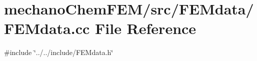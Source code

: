 \section{mechano\+Chem\+F\+E\+M/src/\+F\+E\+Mdata/\+F\+E\+Mdata.cc File Reference}
\label{_f_e_mdata_8cc}
{\ttfamily \#include \char`\"{}../../include/\+F\+E\+Mdata.\+h\char`\"{}}\newline
